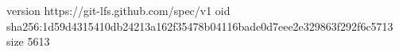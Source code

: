 version https://git-lfs.github.com/spec/v1
oid sha256:1d59d4315410db24213a162f35478b04116bade0d7eee2e329863f292f6c5713
size 5613
